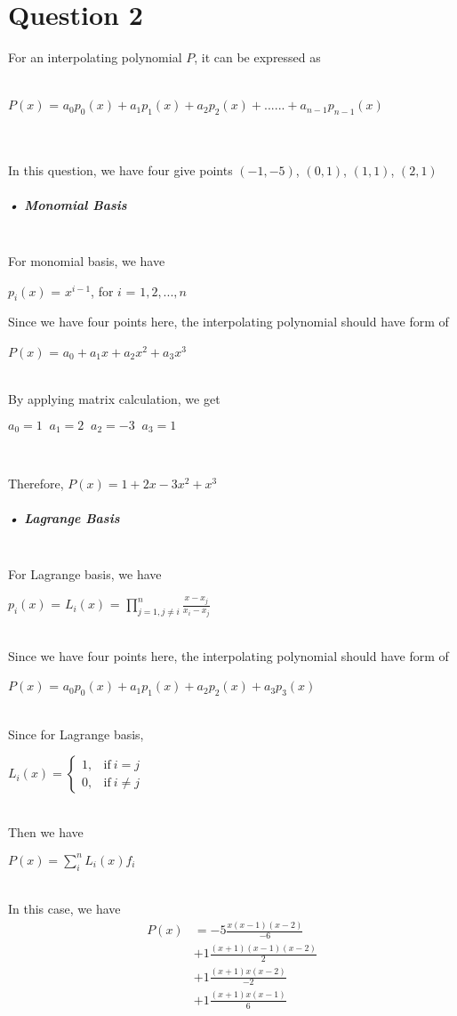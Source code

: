 \documentclass[11pt]{article} %
\begin{document}
\section{Question 2}
For an interpolating polynomial $P$, it can be expressed as\\\\
\centerline{$P(x)$ = $a_{0}p_{0}(x)+a_{1}p_{1}(x)+a_{2}p_{2}(x)+......+a_{n-1}p_{n-1}(x)$}\\\\
In this question, we have four give points $(-1,-5)$, $(0,1)$, $(1,1)$, $(2,1)$
\subparagraph{• Monomial Basis}\mbox{}\\
For monomial basis, we have\\ 
\centerline{$p_{i}(x)$ = $x^{i-1}$, for $i$ = $1,2,...,n$}
Since we have four points here, the interpolating polynomial should have form of\\
\centerline{$P(x)$ = $a_{0} + a_{1}x+ a_{2}x^{2} + a_{3}x^{3}$}\\
By applying matrix calculation, we get\\
\centerline{$a_{0}=1\;\;a_{1}=2\;\;a_{2}=-3\;\;a_{3}=1$}\\
\centerline{Therefore, $P(x) = 1+2x-3x^{2}+x^{3}$}
\subparagraph{• Lagrange Basis}\mbox{}\\
For Lagrange basis, we have\\
\centerline{$p_{i}(x)$ = $L_{i}(x)$ = $\prod_{j=1,j \neq i}^{n}\frac{x-x_{j}}{x_{i}-x_{j}}$}\\
Since we have four points here, the interpolating polynomial should have form of\\
\centerline{$P(x)$ = $a_{0} p_{0}(x)+ a_{1}p_{1}(x)+ a_{2}p_{2}(x) + a_{3}p_{3}(x)$}\\
Since for Lagrange basis,\\
\centerline{$L_{i}(x) = \begin{cases}
      1, & \text{if}\ i=j \\
      0, & \text{if}\ i\neq j
    \end{cases}$}
\centerline{}\\
Then we have\\
\centerline{$P(x) = \sum_{i}^{n}L_{i}(x)f_{i}$}\\
In this case, we have
\begin{equation}
\begin{split}
P(x)&=-5\frac{x(x-1)(x-2)}{-6}\\
	&+1\frac{(x+1)(x-1)(x-2)}{2}\\
	&+1\frac{(x+1)x(x-2)}{-2}\\
	&+1\frac{(x+1)x(x-1)}{6}
\end{split}
\end{equation}
\end{document}

